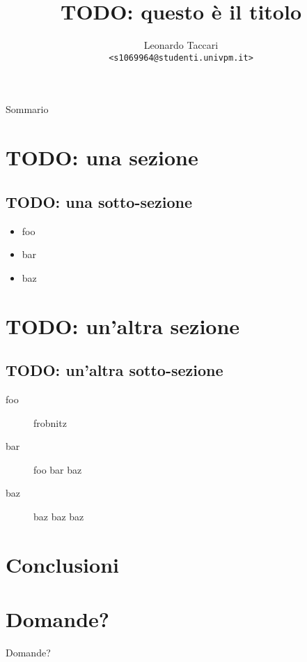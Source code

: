 \documentclass{beamer}
\title{TODO: questo è il titolo}
\author[leot]{Leonardo Taccari \\ {\footnotesize \texttt{<s1069964@studenti.univpm.it>}}}
\date{}
\begin{document}
\begin{frame}
\maketitle
\end{frame}

\begin{frame}{Sommario}
\tableofcontents
\end{frame}

\section{TODO: una sezione}
\begin{frame}{\insertsection}
\end{frame}

\subsection{TODO: una sotto-sezione}
\begin{frame}{\insertsubsection}
\begin{itemize}
\item foo
\item bar
\item baz
\end{itemize}
\end{frame}

\section{TODO: un'altra sezione}
\begin{frame}{\insertsection}
\end{frame}

\subsection{TODO: un'altra sotto-sezione}
\begin{frame}{\insertsubsection}
\begin{description}
\item[foo] frobnitz
\item[bar] foo bar baz
\item[baz] baz baz baz
\end{description}
\end{frame}

\section{Conclusioni}
\begin{frame}{\insertsection}
\end{frame}

\section*{Domande?}
\begin{frame}
\begin{center}
{\Huge Domande?}
\end{center}
\end{frame}
\end{document}
